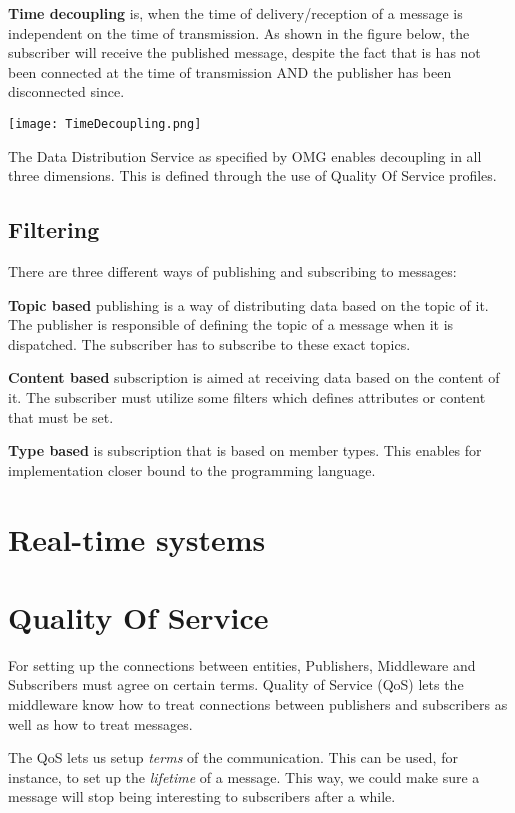 \textbf{Time decoupling} is, when the time of delivery/reception of a message is independent on the time of transmission. As shown in the figure below, the subscriber will receive the published message, despite the fact that is has not been connected at the time of transmission AND the publisher has been disconnected since.

\begin{center}
	\texttt{[image: TimeDecoupling.png]}
\end{center}

The Data Distribution Service as specified by OMG enables decoupling in all three  dimensions. This is defined through the use of Quality Of Service profiles.

\subsection{Filtering}
There are three different ways of publishing and subscribing to messages:

\textbf{Topic based} publishing is a way of distributing data based on the topic of it. The publisher is responsible of defining the topic of a message when it is dispatched. The subscriber has to subscribe to these exact topics.

\textbf{Content based} subscription is aimed at receiving data based on the content of it. The subscriber must utilize some filters which defines attributes or content that must be set.

\textbf{Type based} is subscription that is based on member types. This enables for implementation closer bound to the programming language.


\section{Real-time systems}


\section{Quality Of Service}
For setting up the connections between entities, Publishers, Middleware and Subscribers must agree on certain terms. Quality of Service (QoS) lets the middleware know how to treat connections between publishers and subscribers as well as how to treat messages.

The QoS lets us setup \textit{terms} of the communication. This can be used, for instance, to set up the \textit{lifetime} of a message. This way, we could make sure a message will stop being interesting to subscribers after a while. 

